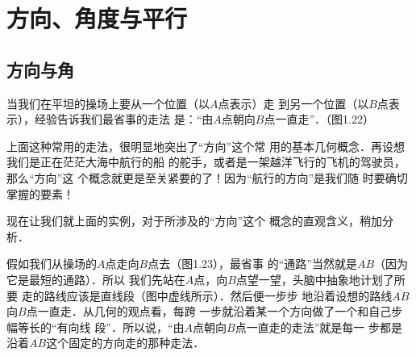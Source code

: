 \section{方向、角度与平行}
\subsection{方向与角}
当我们在平坦的操场上要从一个位置（以$A$点表示）走
到另一个位置（以$B$点表示），经验告诉我们最省事的走法
是：“由$A$点朝向$B$点一直走”．（图1.22）

\begin{figure}[htp]
	\centering
{}
	\caption{}
\end{figure}

上面这种常用的走法，很明显地突出了“方向”这个常
用的基本几何概念．再设想我们是正在茫茫大海中航行的船
的舵手，或者是一架越洋飞行的飞机的驾驶员，那么“方向”这
个概念就更是至关紧要的了！因为“航行的方向”是我们随
时要确切掌握的要素！

现在让我们就上面的实例，对于所涉及的“方向”这个
概念的直观含义，稍加分析．

假如我们从操场的$A$点走向$B$点去（图1.23），最省事
的“通路”当然就是$\overline{AB}$（因为它是最短的通路）．所以
我们先站在$A$点，向$B$点望一望，头脑中抽象地计划了所要
走的路线应该是直线段（图中虚线所示）．然后便一步步
地沿着设想的路线$\overline{AB}$向$B$点一直走．从几何的观点看，每跨
一步就沿着某一个方向做了一个和自己步幅等长的“有向线
段”．所以说，“由$A$点朝向$B$点一直走的走法”就是每一
步都是沿着$\overline{AB}$这个固定的方向走的那种走法．


\begin{figure}[htp]
	\centering
{}
	\caption{}
\end{figure}


